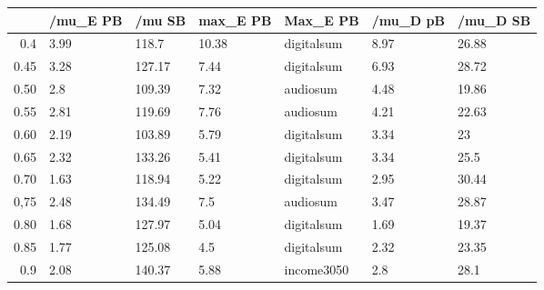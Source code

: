 \begin{table}[ht]
\centering
\begin{tabular}{rllllll}
  \hline
 & /mu\_E PB & /mu SB & max\_E PB & Max\_E PB & /mu\_D pB & /mu\_D SB \\ 
  \hline
0.4 & 3.99 & 118.7 & 10.38 & digitalsum & 8.97 & 26.88 \\ 
  0.45 & 3.28 & 127.17 & 7.44 & digitalsum & 6.93 & 28.72 \\ 
  0.50 & 2.8 & 109.39 & 7.32 & audiosum & 4.48 & 19.86 \\ 
  0.55 & 2.81 & 119.69 & 7.76 & audiosum & 4.21 & 22.63 \\ 
  0.60 & 2.19 & 103.89 & 5.79 & digitalsum & 3.34 & 23 \\ 
  0.65 & 2.32 & 133.26 & 5.41 & digitalsum & 3.34 & 25.5 \\ 
  0.70 & 1.63 & 118.94 & 5.22 & digitalsum & 2.95 & 30.44 \\ 
  0,75 & 2.48 & 134.49 & 7.5 & audiosum & 3.47 & 28.87 \\ 
  0.80 & 1.68 & 127.97 & 5.04 & digitalsum & 1.69 & 19.37 \\ 
  0.85 & 1.77 & 125.08 & 4.5 & digitalsum & 2.32 & 23.35 \\ 
  0.9 & 2.08 & 140.37 & 5.88 & income3050 & 2.8 & 28.1 \\ 
   \hline
\end{tabular}
\end{table}
